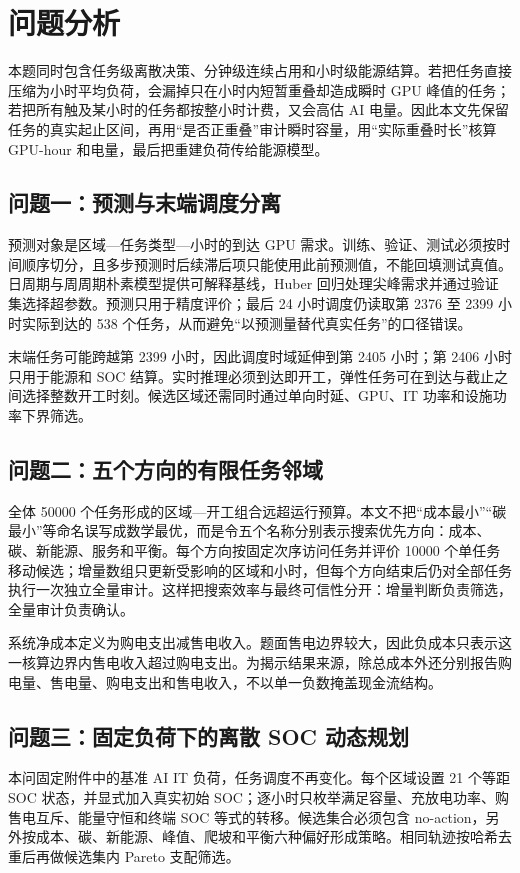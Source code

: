 \section{问题分析}
本题同时包含任务级离散决策、分钟级连续占用和小时级能源结算。若把任务直接压缩为小时平均负荷，会漏掉只在小时内短暂重叠却造成瞬时 GPU 峰值的任务；若把所有触及某小时的任务都按整小时计费，又会高估 AI 电量。因此本文先保留任务的真实起止区间，再用“是否正重叠”审计瞬时容量，用“实际重叠时长”核算 GPU-hour 和电量，最后把重建负荷传给能源模型。

\subsection{问题一：预测与末端调度分离}
预测对象是区域—任务类型—小时的到达 GPU 需求。训练、验证、测试必须按时间顺序切分，且多步预测时后续滞后项只能使用此前预测值，不能回填测试真值。日周期与周周期朴素模型提供可解释基线，Huber 回归处理尖峰需求并通过验证集选择超参数\cite{huber1964robust}。预测只用于精度评价；最后 24 小时调度仍读取第 2376 至 2399 小时实际到达的 538 个任务，从而避免“以预测量替代真实任务”的口径错误。

末端任务可能跨越第 2399 小时，因此调度时域延伸到第 2405 小时；第 2406 小时只用于能源和 SOC 结算。实时推理必须到达即开工，弹性任务可在到达与截止之间选择整数开工时刻。候选区域还需同时通过单向时延、GPU、IT 功率和设施功率下界筛选。

\subsection{问题二：五个方向的有限任务邻域}
全体 50000 个任务形成的区域—开工组合远超运行预算。本文不把“成本最小”“碳最小”等命名误写成数学最优，而是令五个名称分别表示搜索优先方向：成本、碳、新能源、服务和平衡。每个方向按固定次序访问任务并评价 10000 个单任务移动候选；增量数组只更新受影响的区域和小时，但每个方向结束后仍对全部任务执行一次独立全量审计。这样把搜索效率与最终可信性分开：增量判断负责筛选，全量审计负责确认。

系统净成本定义为购电支出减售电收入。题面售电边界较大，因此负成本只表示这一核算边界内售电收入超过购电支出。为揭示结果来源，除总成本外还分别报告购电量、售电量、购电支出和售电收入，不以单一负数掩盖现金流结构。

\subsection{问题三：固定负荷下的离散 SOC 动态规划}
本问固定附件中的基准 AI IT 负荷，任务调度不再变化。每个区域设置 21 个等距 SOC 状态，并显式加入真实初始 SOC；逐小时只枚举满足容量、充放电功率、购售电互斥、能量守恒和终端 SOC 等式的转移。候选集合必须包含 no-action，另外按成本、碳、新能源、峰值、爬坡和平衡六种偏好形成策略。相同轨迹按哈希去重后再做候选集内 Pareto 支配筛选\cite{miettinen1999nonlinear}。

